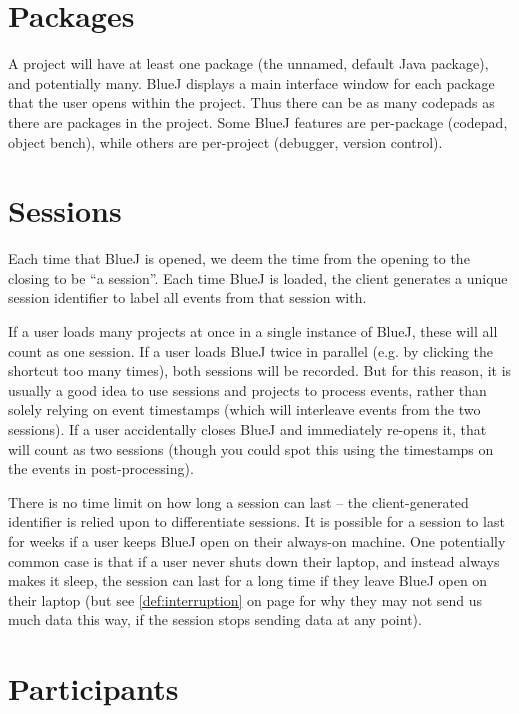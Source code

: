 \documentclass{report}
\newcommand{\myref}[1]{\autoref{#1} on page \pageref*{#1}}
\begin{document}
\section{Packages}
\label{def:packages}

A project will have at least one package (the unnamed, default Java package),
and potentially many.  BlueJ displays a main interface window for each package
that the user opens within the project.  Thus there can be as many codepads as
there are packages in the project.  Some BlueJ features are per-package (codepad,
object bench), while others are per-project (debugger, version control).

\section{Sessions}
\label{def:sequence_id}

Each time that BlueJ is opened, we deem the time from the opening to the
closing to be ``a session''.  Each time BlueJ is loaded, the client generates
a unique session identifier to label all events from that session with.

If a user loads many projects at once in a single instance of BlueJ, these
will all count as one session.  If a user loads BlueJ twice in parallel
(e.g. by clicking the shortcut too many times), both sessions will be
recorded.  But for this reason, it is usually a good idea to use sessions and projects to
process events, rather than solely relying on event timestamps (which will
interleave events from the two sessions).  If a user accidentally closes BlueJ
and immediately re-opens it, that will count as two sessions (though you could
spot this using the timestamps on the events in post-processing).

There is no time limit on how long a session can last -- the client-generated
identifier is relied upon to differentiate sessions.  It is possible for a
session to last for weeks if a user keeps BlueJ open on their always-on
machine.  One potentially common case is that if a user never shuts down their
laptop, and instead always makes it sleep, the session can last for a long
time if they leave BlueJ open on their laptop (but see
\myref{def:interruption} for why they may not send us much data this way, if the session
stops sending data at any point).

\section{Participants}
\label{sec:participants}
\end{document}
